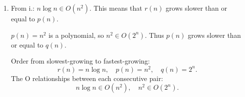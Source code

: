 \documentclass[12pt]{article}
\begin{document}
\begin{enumerate}
\begin{enumerate}
        \item[ii.]        
        From i.: $n\log n \in O(n^2)$.
        This means that $r(n)$ grows slower than or equal to $p(n)$.

        
        $p(n)=n^2$ is a polynomial, so $n^2\in O(2^n)$.
        Thus $p(n)$ grows slower than or equal to $q(n)$.
        
        Order from slowest-growing to fastest-growing:
        \[
        {r(n)=n\log n,\quad p(n)=n^2,\quad q(n)=2^n}.
        \]
        The O relationships between each consecutive pair:
        \[
        n\log n \in O(n^2),  \quad  n^2\in O(2^n).
        \]
    \end{enumerate}
\end{enumerate}
\end{document}
